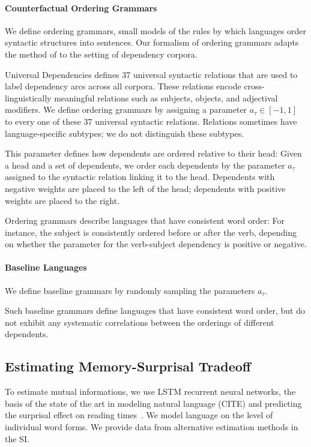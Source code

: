 \documentclass[11pt,letterpaper]{article}
\begin{document}
\paragraph{Counterfactual Ordering Grammars}
We define ordering grammars, small models of the rules by which languages order syntactic structures into sentences.
Our formalism of ordering grammars adapts the method of \cite{gildea-optimizing-2007, gildea-grammars-2010, gildea-human-2015} to the setting of dependency corpora.

Universal Dependencies defines 37 universal syntactic relations that are used to label dependency arcs across all corpora.
These relations encode cross-linguistically meaningful relations such as subjects, objects, and adjectival modifiers.
We define ordering grammars by assigning a parameter $a_\tau \in [-1,1]$ to every one of these 37 universal syntactic relations.
Relations sometimes have language-specific subtypes; we do not distinguish these subtypes.

This parameter defines how dependents are ordered relative to their head:
Given a head and a set of dependents, we order each dependents by the parameter $a_\tau$ assigned to the syntactic relation linking it to the head.
Dependents with negative weights are placed to the left of the head; dependents with positive weights are placed to the right.

Ordering grammars describe languages that have consistent word order:
For instance, the subject is consistently ordered before or after the verb, depending on whether the parameter for the verb-subject dependency is positive or negative.


\paragraph{Baseline Languages}
We define baseline grammars by randomly sampling the parameters $a_\tau$.

Such baseline grammars define languages that have consistent word order, but do not exhibit any systematic correlations between the orderings of different dependents.



\subsection{Estimating Memory-Surprisal Tradeoff}\label{sec:method}
To estimate mutual informations, we use LSTM recurrent neural networks, the basis of the state of the art in modeling natural language (CITE) and predicting the surprisal effect on reading times~\citep{frank-insensitivity-2011, goodkind-predictive-2018}.
We model language on the level of individual word forms.
We provide data from alternative estimation methods in the SI.
\end{document}
